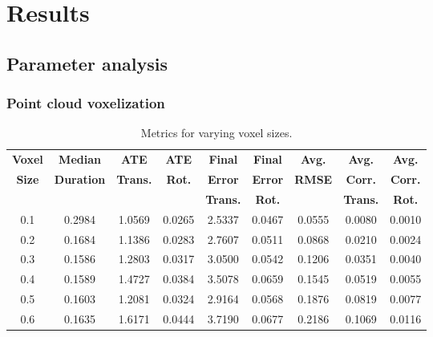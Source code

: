 \chapter{Results}
\label{ch:results}

\section{Parameter analysis}

\subsection{Point cloud voxelization}
\begin{table}[h]
    \centering
    \begin{tabular}{|c|c|c|c|c|c|c|c|c|}
        \hline
        \textbf{Voxel} & \textbf{Median}   & \textbf{ATE}    & \textbf{ATE}  & \textbf{Final } & \textbf{Final} & \textbf{Avg.} & \textbf{Avg.}   & \textbf{Avg.}  \\
        \textbf{Size}  & \textbf{Duration} & \textbf{Trans.} & \textbf{Rot.} & \textbf{Error}  & \textbf{Error} & \textbf{RMSE} & \textbf{Corr.}  & \textbf{Corr.} \\
                       &                   & \textbf{}       & \textbf{}     & \textbf{Trans.} & \textbf{Rot.}  & \textbf{}     & \textbf{Trans.} & \textbf{Rot.}  \\
        \hline
        \hline
        0.1            & 0.2984            & 1.0569          & 0.0265        & 2.5337          & 0.0467         & 0.0555        & 0.0080          & 0.0010         \\
        0.2            & 0.1684            & 1.1386          & 0.0283        & 2.7607          & 0.0511         & 0.0868        & 0.0210          & 0.0024         \\
        0.3            & 0.1586            & 1.2803          & 0.0317        & 3.0500          & 0.0542         & 0.1206        & 0.0351          & 0.0040         \\
        0.4            & 0.1589            & 1.4727          & 0.0384        & 3.5078          & 0.0659         & 0.1545        & 0.0519          & 0.0055         \\
        0.5            & 0.1603            & 1.2081          & 0.0324        & 2.9164          & 0.0568         & 0.1876        & 0.0819          & 0.0077         \\
        0.6            & 0.1635            & 1.6171          & 0.0444        & 3.7190          & 0.0677         & 0.2186        & 0.1069          & 0.0116         \\
        \hline
    \end{tabular}
    \caption{Metrics for varying voxel sizes.}
    \label{tab:voxel_metrics}
\end{table}

